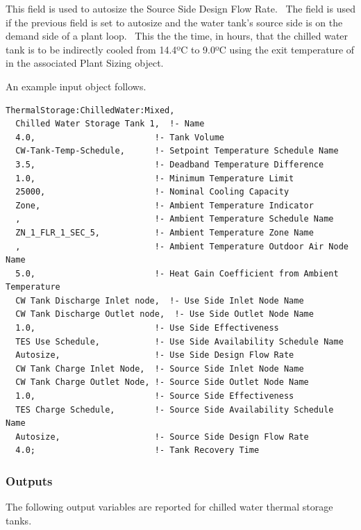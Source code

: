This field is used to autosize the Source Side Design Flow Rate.~ The field is used if the previous field is set to autosize and the water tank's source side is on the demand side of a plant loop.~ This the the time, in hours, that the chilled water tank is to be indirectly cooled from 14.4ºC to 9.0ºC using the exit temperature of in the associated Plant Sizing object.

An example input object follows.

\begin{lstlisting}
ThermalStorage:ChilledWater:Mixed,
  Chilled Water Storage Tank 1,  !- Name
  4.0,                        !- Tank Volume
  CW-Tank-Temp-Schedule,      !- Setpoint Temperature Schedule Name
  3.5,                        !- Deadband Temperature Difference
  1.0,                        !- Minimum Temperature Limit
  25000,                      !- Nominal Cooling Capacity
  Zone,                       !- Ambient Temperature Indicator
  ,                           !- Ambient Temperature Schedule Name
  ZN_1_FLR_1_SEC_5,           !- Ambient Temperature Zone Name
  ,                           !- Ambient Temperature Outdoor Air Node Name
  5.0,                        !- Heat Gain Coefficient from Ambient Temperature
  CW Tank Discharge Inlet node,  !- Use Side Inlet Node Name
  CW Tank Discharge Outlet node,  !- Use Side Outlet Node Name
  1.0,                        !- Use Side Effectiveness
  TES Use Schedule,           !- Use Side Availability Schedule Name
  Autosize,                   !- Use Side Design Flow Rate
  CW Tank Charge Inlet Node,  !- Source Side Inlet Node Name
  CW Tank Charge Outlet Node, !- Source Side Outlet Node Name
  1.0,                        !- Source Side Effectiveness
  TES Charge Schedule,        !- Source Side Availability Schedule Name
  Autosize,                   !- Source Side Design Flow Rate
  4.0;                        !- Tank Recovery Time
\end{lstlisting}

\subsubsection{Outputs}\label{outputs-20-000}

The following output variables are reported for chilled water thermal storage tanks.

